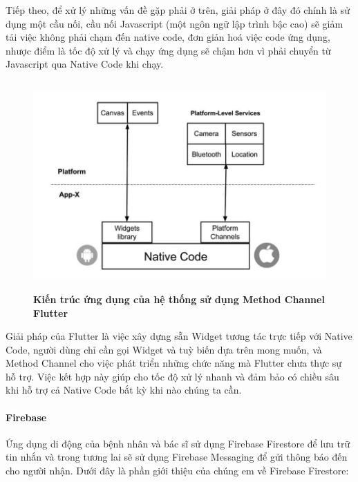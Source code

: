 Tiếp theo, để xử lý những vấn đề gặp phải ở trên, giải pháp ở đây đó chính là sử dụng một cầu nối, cầu nối Javascript (một ngôn ngữ lập trình bậc cao)
sẽ giảm tải việc không phải chạm đến native code, đơn giản hoá việc code ứng dụng, nhược điểm là tốc độ xử lý và chạy ứng
dụng sẽ chậm hơn vì phải chuyển từ Javascript qua Native Code khi chạy. 

\begin{figure}[H]
  \centering
  \includegraphics[width=15cm,height=8cm]{Images/system/flutter_dart.png}
  \caption[Kiến trúc ứng dụng của hệ thống sử dụng Method Channel Flutter]{\bfseries \fontsize{12pt}{0pt}
  \selectfont Kiến trúc ứng dụng của hệ thống sử dụng Method Channel Flutter}
  \label{flutter_dart} %
\end{figure}

Giải pháp của Flutter là việc xây dựng sẵn Widget tương tác trực tiếp với Native Code, người dùng chỉ cần gọi Widget và tuỳ
biến dựa trên mong muốn, và Method Channel cho việc phát triển những chức năng mà Flutter chưa thực sự hỗ trợ. Việc kết hợp này
giúp cho tốc độ xử lý nhanh và đảm bảo có chiều sâu khi hỗ trợ cả Native Code bắt kỳ khi nào chúng ta cần.


\paragraph{Firebase}
\mbox{}

Ứng dụng di động của bệnh nhân và bác sĩ sử dụng Firebase Firestore để lưu trữ tin nhắn và trong tương lai sẽ sử dụng Firebase
Messaging để gửi thông báo đến cho người nhận. Dưới đây là phần giới thiệu của chúng em về Firebase Firestore:


